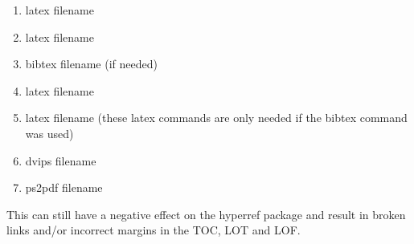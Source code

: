 \begin{enumerate}

\item latex filename
\item latex filename
\item bibtex filename (if needed)
\item latex filename
\item latex filename  (these latex commands are only needed if the bibtex command was used)
\item dvips filename
\item ps2pdf filename
\end{enumerate}
This can still have a negative effect on the hyperref package and result in broken links and/or incorrect margins in the TOC, LOT and LOF. 